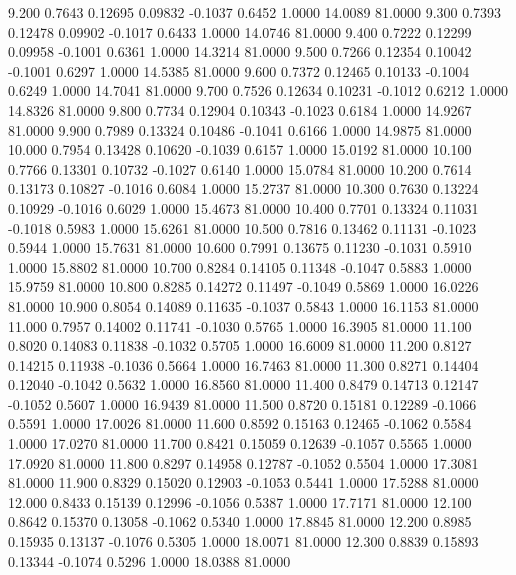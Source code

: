    9.200   0.7643   0.12695   0.09832  -0.1037   0.6452   1.0000  14.0089  81.0000
   9.300   0.7393   0.12478   0.09902  -0.1017   0.6433   1.0000  14.0746  81.0000
   9.400   0.7222   0.12299   0.09958  -0.1001   0.6361   1.0000  14.3214  81.0000
   9.500   0.7266   0.12354   0.10042  -0.1001   0.6297   1.0000  14.5385  81.0000
   9.600   0.7372   0.12465   0.10133  -0.1004   0.6249   1.0000  14.7041  81.0000
   9.700   0.7526   0.12634   0.10231  -0.1012   0.6212   1.0000  14.8326  81.0000
   9.800   0.7734   0.12904   0.10343  -0.1023   0.6184   1.0000  14.9267  81.0000
   9.900   0.7989   0.13324   0.10486  -0.1041   0.6166   1.0000  14.9875  81.0000
  10.000   0.7954   0.13428   0.10620  -0.1039   0.6157   1.0000  15.0192  81.0000
  10.100   0.7766   0.13301   0.10732  -0.1027   0.6140   1.0000  15.0784  81.0000
  10.200   0.7614   0.13173   0.10827  -0.1016   0.6084   1.0000  15.2737  81.0000
  10.300   0.7630   0.13224   0.10929  -0.1016   0.6029   1.0000  15.4673  81.0000
  10.400   0.7701   0.13324   0.11031  -0.1018   0.5983   1.0000  15.6261  81.0000
  10.500   0.7816   0.13462   0.11131  -0.1023   0.5944   1.0000  15.7631  81.0000
  10.600   0.7991   0.13675   0.11230  -0.1031   0.5910   1.0000  15.8802  81.0000
  10.700   0.8284   0.14105   0.11348  -0.1047   0.5883   1.0000  15.9759  81.0000
  10.800   0.8285   0.14272   0.11497  -0.1049   0.5869   1.0000  16.0226  81.0000
  10.900   0.8054   0.14089   0.11635  -0.1037   0.5843   1.0000  16.1153  81.0000
  11.000   0.7957   0.14002   0.11741  -0.1030   0.5765   1.0000  16.3905  81.0000
  11.100   0.8020   0.14083   0.11838  -0.1032   0.5705   1.0000  16.6009  81.0000
  11.200   0.8127   0.14215   0.11938  -0.1036   0.5664   1.0000  16.7463  81.0000
  11.300   0.8271   0.14404   0.12040  -0.1042   0.5632   1.0000  16.8560  81.0000
  11.400   0.8479   0.14713   0.12147  -0.1052   0.5607   1.0000  16.9439  81.0000
  11.500   0.8720   0.15181   0.12289  -0.1066   0.5591   1.0000  17.0026  81.0000
  11.600   0.8592   0.15163   0.12465  -0.1062   0.5584   1.0000  17.0270  81.0000
  11.700   0.8421   0.15059   0.12639  -0.1057   0.5565   1.0000  17.0920  81.0000
  11.800   0.8297   0.14958   0.12787  -0.1052   0.5504   1.0000  17.3081  81.0000
  11.900   0.8329   0.15020   0.12903  -0.1053   0.5441   1.0000  17.5288  81.0000
  12.000   0.8433   0.15139   0.12996  -0.1056   0.5387   1.0000  17.7171  81.0000
  12.100   0.8642   0.15370   0.13058  -0.1062   0.5340   1.0000  17.8845  81.0000
  12.200   0.8985   0.15935   0.13137  -0.1076   0.5305   1.0000  18.0071  81.0000
  12.300   0.8839   0.15893   0.13344  -0.1074   0.5296   1.0000  18.0388  81.0000
